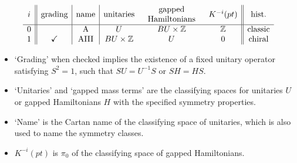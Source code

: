 \documentclass[12pt]{article}
\numberwithin{equation}{section}
\numberwithin{figure}{section}
\theoremstyle{remark}
\renewenvironment{table}[1][]{
  \begin{originaltable}[#1]
    \begin{mdframed}[linecolor=black!0,backgroundcolor=black!1]
}{
    \end{mdframed}
  \end{originaltable}
}
\def\bZ{\mathbb{Z}}
\begin{document}
\begin{table}
\[
\begin{array}{c||c|c|ccc||c}
i & \text{grading}& \text{name} & \text{unitaries} & \begin{tabular}{c} gapped \\ Hamiltonians\end{tabular} & K^{-i}(pt) & \text{hist.}\\
\hline
0&  & \text{A} & U & BU \times \bZ& \bZ  & \text{classic}\\
1 & \checkmark & \text{AIII} & BU\times \bZ & U & 0 & \text{chiral}
\end{array}
\]
\medskip
\begin{itemize}
\item `Grading' when checked implies the existence of a fixed unitary operator satisfying $S^2=1$,
such that $SU=U^{-1}S$ or $SH=HS$.
\item `Unitaries' and `gapped mass terms' are the classifying spaces for unitaries $U$ or
gapped Hamiltonians $H$ with the specified symmetry properties.
\item `Name' is the Cartan name of the classifying space of unitaries, 
which is also used to name the symmetry classes.
\item $K^{-i}(pt)$ is $\pi_0$ of the classifying space of gapped Hamiltonians.
\end{itemize}
\caption{Symmetry classes: two complex ones. \label{tab:complex-classes}}
\end{table}
\end{document}
